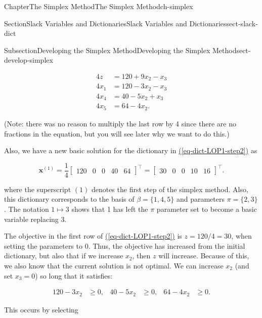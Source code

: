 \documentclass[oneside,10pt,]{book}
\newcommand{\xreffont}{\relax}
\numberwithin{equation}{section}
\newcommand{\amp}{&}
\begin{document}
\begin{chapterptx}{Chapter}{The Simplex Method}{}{The Simplex Method}{}{}{ch-simplex}
\begin{sectionptx}{Section}{Slack Variables and Dictionaries}{}{Slack Variables and Dictionaries}{}{}{sect-slack-dict}
\begin{subsectionptx}{Subsection}{Developing the Simplex Method}{}{Developing the Simplex Method}{}{}{sect-develop-simplex}
\par
%
\begin{equation}
\begin{aligned} 4z\amp= 120 +9x_2-x_3 \\ 4x_1\amp=120 -3x_2-x_3 \\ 4x_4\amp= 40 -5x_2+x_3 \\ 4x_5\amp= 64-4x_2.
\end{aligned}\label{eq-dict-LOP1-step2}
\end{equation}
%
\par
(Note: there was no reason to multiply the last row by 4 since there are no fractions in the equation, but you will see later why we want to do this.)%
\par
Also, we have a new basic solution for the dictionary in \hyperref[eq-dict-LOP1-step2]{({\xreffont\ref{eq-dict-LOP1-step2}})} as%
\par
%
\begin{equation*}
\boldsymbol{x}^{(1)}= \frac{1}{4}\left[\begin{array}{rr|rrr} 120 \amp 0 \amp 0 \amp 40 \amp 64 \end{array}\right]^{\intercal} =
\left[\begin{array}{rr|rrr} 30 \amp 0 \amp 0 \amp 10 \amp 16\end{array}\right]^{\intercal}.
\end{equation*}
%
\par
where the superscript \((1)\) denotes the first step of the simplex method. Also, this dictionary corresponds to the basis of \(\beta=\{1,4,5\}\) and parameters \(\pi=\{2,3\}\). The notation \(1 \mapsto 3\) shows that 1 has left the \(\pi\) parameter set to become a basic variable replacing 3.%
\par
The objective in the first row of \hyperref[eq-dict-LOP1-step2]{({\xreffont\ref{eq-dict-LOP1-step2}})} is \(z = 120/4=30\), when setting the parameters to 0. Thus, the objective has increased from the initial dictionary, but also that if we increase \(x_2\), then \(z\) will increase. Because of this, we also know that the current solution is not optimal. We can increase \(x_2\) (and set \(x_3=0\)) so long that it satisfies:%
\par
%
\begin{align*}
120-3x_2\amp\geq 0,\amp 40-5x_2\amp\geq 0,\amp64-4x_2\amp\geq 0.
\end{align*}
%
\par
This occurs by selecting%
\par
%
\begin{equation*}

\end{equation*}
\end{subsectionptx}
\end{sectionptx}
\end{chapterptx}
\end{document}
